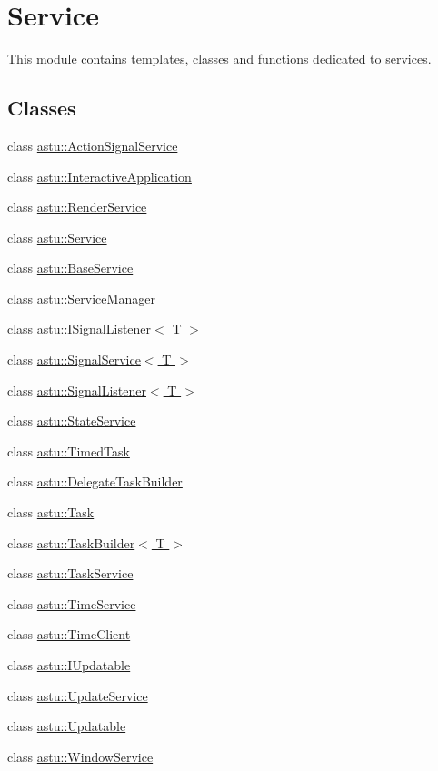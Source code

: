 \hypertarget{group__srv__group}{}\section{Service}
\label{group__srv__group}


This module contains templates, classes and functions dedicated to services.  


\subsection*{Classes}
\begin{DoxyCompactItemize}
\item 
class \hyperlink{classastu_1_1ActionSignalService}{astu\+::\+Action\+Signal\+Service}
\item 
class \hyperlink{classastu_1_1InteractiveApplication}{astu\+::\+Interactive\+Application}
\item 
class \hyperlink{classastu_1_1RenderService}{astu\+::\+Render\+Service}
\item 
class \hyperlink{classastu_1_1Service}{astu\+::\+Service}
\item 
class \hyperlink{classastu_1_1BaseService}{astu\+::\+Base\+Service}
\item 
class \hyperlink{classastu_1_1ServiceManager}{astu\+::\+Service\+Manager}
\item 
class \hyperlink{classastu_1_1ISignalListener}{astu\+::\+I\+Signal\+Listener$<$ T $>$}
\item 
class \hyperlink{classastu_1_1SignalService}{astu\+::\+Signal\+Service$<$ T $>$}
\item 
class \hyperlink{classastu_1_1SignalListener}{astu\+::\+Signal\+Listener$<$ T $>$}
\item 
class \hyperlink{classastu_1_1StateService}{astu\+::\+State\+Service}
\item 
class \hyperlink{classastu_1_1TimedTask}{astu\+::\+Timed\+Task}
\item 
class \hyperlink{classastu_1_1DelegateTaskBuilder}{astu\+::\+Delegate\+Task\+Builder}
\item 
class \hyperlink{classastu_1_1Task}{astu\+::\+Task}
\item 
class \hyperlink{classastu_1_1TaskBuilder}{astu\+::\+Task\+Builder$<$ T $>$}
\item 
class \hyperlink{classastu_1_1TaskService}{astu\+::\+Task\+Service}
\item 
class \hyperlink{classastu_1_1TimeService}{astu\+::\+Time\+Service}
\item 
class \hyperlink{classastu_1_1TimeClient}{astu\+::\+Time\+Client}
\item 
class \hyperlink{classastu_1_1IUpdatable}{astu\+::\+I\+Updatable}
\item 
class \hyperlink{classastu_1_1UpdateService}{astu\+::\+Update\+Service}
\item 
class \hyperlink{classastu_1_1Updatable}{astu\+::\+Updatable}
\item 
class \hyperlink{classastu_1_1WindowService}{astu\+::\+Window\+Service}
\end{DoxyCompactItemize}
